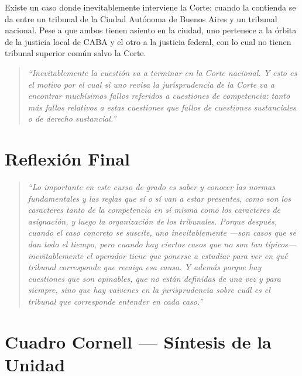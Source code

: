 \documentclass[12pt,oneside]{book}
\begin{document}
Existe un caso donde inevitablemente interviene la Corte: cuando la contienda se da entre un tribunal de la Ciudad Autónoma de Buenos Aires y un tribunal nacional. Pese a que ambos tienen asiento en la ciudad, uno pertenece a la órbita de la justicia local de CABA y el otro a la justicia federal, con lo cual no tienen tribunal superior común salvo la Corte.

\begin{quote}
\itshape
``Inevitablemente la cuestión va a terminar en la Corte nacional. Y esto es el motivo por el cual si uno revisa la jurisprudencia de la Corte va a encontrar muchísimos fallos referidos a cuestiones de competencia: tanto más fallos relativos a estas cuestiones que fallos de cuestiones sustanciales o de derecho sustancial.''
\end{quote}

\section{Reflexión Final}

\begin{quote}
\itshape
``Lo importante en este curso de grado es saber y conocer las normas fundamentales y las reglas que sí o sí van a estar presentes, como son los caracteres tanto de la competencia en sí misma como los caracteres de asignación, y luego la organización de los tribunales. Porque después, cuando el caso concreto se suscite, uno inevitablemente —son casos que se dan todo el tiempo, pero cuando hay ciertos casos que no son tan típicos— inevitablemente el operador tiene que ponerse a estudiar para ver en qué tribunal corresponde que recaiga esa causa. Y además porque hay cuestiones que son opinables, que no están definidas de una vez y para siempre, sino que hay vaivenes en la jurisprudencia sobre cuál es el tribunal que corresponde entender en cada caso.''
\end{quote}

\section{Cuadro Cornell — Síntesis de la Unidad}
\end{document}
